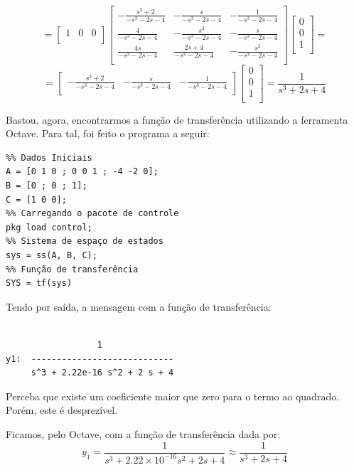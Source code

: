 \documentclass[11pt]{article}
\begin{document}
\[=
  \left[ {\begin{array}{ccc}
    1 & 0 & 0 \\
  \end{array} } \right]
  \left[ \begin{array}{rcr}
    -\frac{s^2 + 2}{-s^3-2s-4} & -\frac{s}{-s^3-2s-4}  & -\frac{1}{-s^3-2s-4} \\ 
    \frac{4}{-s^3-2s-4} & -\frac{s^2}{-s^3-2s-4} & -\frac{s}{-s^3-2s-4} \\
    \frac{4s}{-s^3-2s-4} & \frac{2s+4}{-s^3-2s-4}  & -\frac{s^2}{-s^3-2s-4} \\
  \end{array} \right]
  \left[ {\begin{array}{c}
    0 \\
    0 \\
    1 \\
  \end{array} } \right]
  =
  \] 
  \[
    =
  \left[ {\begin{array}{ccc}
    -\frac{s^2 + 2}{-s^3-2s-4} & -\frac{s}{-s^3-2s-4} & -\frac{1}{-s^3-2s-4} \\
  \end{array} } \right]
  \left[ {\begin{array}{c}
    0 \\
    0 \\
    1 \\
  \end{array} } \right]
  = \frac{1}{s^3 + 2s + 4}
\]

Bastou, agora, encontrarmos a função de transferência utilizando a ferramenta Octave. Para tal, foi feito o programa a seguir:
\begin{verbatim}
%% Dados Iniciais
A = [0 1 0 ; 0 0 1 ; -4 -2 0];
B = [0 ; 0 ; 1];
C = [1 0 0];
%% Carregando o pacote de controle
pkg load control;
%% Sistema de espaço de estados
sys = ss(A, B, C);
%% Função de transferência
SYS = tf(sys)
\end{verbatim}

Tendo por saída, a mensagem com a função de transferência:
\begin{verbatim}

                  1
y1:  ----------------------------
     s^3 + 2.22e-16 s^2 + 2 s + 4
\end{verbatim}
Perceba que existe um coeficiente maior que zero para o termo ao quadrado. Porém, este é desprezível.

Ficamos, pelo Octave, com a função de transferência dada por:
\[y_1 = \frac{1}{s^3 + 2.22 \times 10^{-16} s^2 + 2s + 4} \approx \frac{1}{s^3 + 2s + 4}\]
\end{document}
